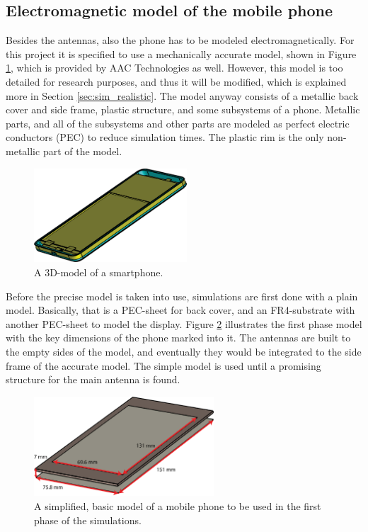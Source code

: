 \vspace{-15pt}
\subsection{Electromagnetic model of the mobile phone}
\label{sec:phone}
Besides the antennas, also the phone has to be modeled electromagnetically. For this project it is specified to use a mechanically accurate model, shown in Figure \ref{fig:cad}, which is provided by AAC Technologies as well. However, this model is too detailed for research purposes, and thus it will be modified, which is explained more in Section \ref{sec:sim_realistic}. The model anyway consists of a metallic back cover and side frame, plastic structure, and some subsystems of a phone. Metallic parts, and all of the subsystems and other parts are modeled as perfect electric conductors (PEC) to reduce simulation times. The plastic rim is the only non-metallic part of the model.

\begin{figure}[H]
    \vspace{-7pt}
    \centering
    \includegraphics[width=0.51\textwidth]{img/cad.eps}
    \caption{A 3D-model of a smartphone.}
    \label{fig:cad}
\end{figure}

Before the precise model is taken into use, simulations are first done with a plain model. Basically, that is a PEC-sheet for back cover, and an FR4-substrate with another PEC-sheet to model the display. Figure \ref{fig:basic_structure} illustrates the first phase model with the key dimensions of the phone marked into it. The antennas are built to the empty sides of the model, and eventually they would be integrated to the side frame of the accurate model. The simple model is used until a promising structure for the main antenna is found. 
\begin{figure}[H]
    \centering
    \includegraphics[width=0.6\textwidth]{img/basic_structure.eps}
    \caption{A simplified, basic model of a mobile phone to be used in the first phase of the simulations.}
    \label{fig:basic_structure}
\end{figure}

